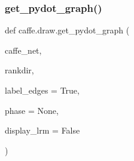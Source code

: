 \subsubsection{\texorpdfstring{get\+\_\+pydot\+\_\+graph()}{get\_pydot\_graph()}}
{\footnotesize\ttfamily def caffe.\+draw.\+get\+\_\+pydot\+\_\+graph (\begin{DoxyParamCaption}\item[{}]{caffe\+\_\+net,  }\item[{}]{rankdir,  }\item[{}]{label\+\_\+edges = {\ttfamily True},  }\item[{}]{phase = {\ttfamily None},  }\item[{}]{display\+\_\+lrm = {\ttfamily False} }\end{DoxyParamCaption})}

